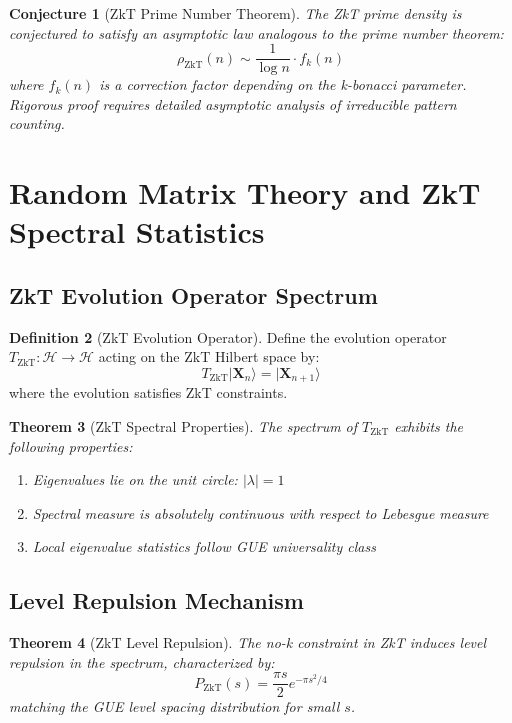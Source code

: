 \documentclass[12pt]{article}
\theoremstyle{plain}
\newtheorem{theorem}{Theorem}[section]
\newtheorem{conjecture}[theorem]{Conjecture}
\theoremstyle{definition}
\newtheorem{definition}[theorem]{Definition}
\newcommand{\cH}{\mathcal{H}}
\begin{document}
\begin{conjecture}[ZkT Prime Number Theorem]
The ZkT prime density is conjectured to satisfy an asymptotic law analogous to the prime number theorem:
\begin{equation}
\rho_{\text{ZkT}}(n) \sim \frac{1}{\log n} \cdot f_k(n)
\end{equation}
where $f_k(n)$ is a correction factor depending on the k-bonacci parameter. Rigorous proof requires detailed asymptotic analysis of irreducible pattern counting.
\end{conjecture}

\section{Random Matrix Theory and ZkT Spectral Statistics}

\subsection{ZkT Evolution Operator Spectrum}

\begin{definition}[ZkT Evolution Operator]
Define the evolution operator $T_{\text{ZkT}}: \cH \to \cH$ acting on the ZkT Hilbert space by:
\begin{equation}
T_{\text{ZkT}} |\mathbf{X}_n\rangle = |\mathbf{X}_{n+1}\rangle
\end{equation}
where the evolution satisfies ZkT constraints.
\end{definition}

\begin{theorem}[ZkT Spectral Properties]
The spectrum of $T_{\text{ZkT}}$ exhibits the following properties:
\begin{enumerate}
\item Eigenvalues lie on the unit circle: $|\lambda| = 1$
\item Spectral measure is absolutely continuous with respect to Lebesgue measure
\item Local eigenvalue statistics follow GUE universality class
\end{enumerate}
\end{theorem}

\subsection{Level Repulsion Mechanism}

\begin{theorem}[ZkT Level Repulsion]
The no-k constraint in ZkT induces level repulsion in the spectrum, characterized by:
\begin{equation}
P_{\text{ZkT}}(s) = \frac{\pi s}{2} e^{-\pi s^2/4}
\end{equation}
matching the GUE level spacing distribution for small $s$.
\end{theorem}
\end{document}
